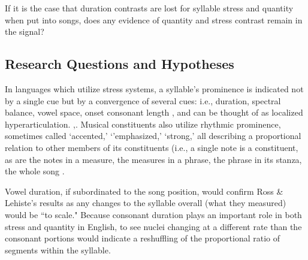 \documentclass[12pt]{article}
\begin{document}
If it is the case that duration contrasts are lost for syllable stress and quantity when put into songs, does any evidence of quantity and stress contrast remain in the signal? 
%
%






\subsection*{Research Questions and Hypotheses}

In languages which utilize stress systems, a syllable's prominence is indicated not by a single cue but by a convergence of several cues: i.e.,  duration\cite{dejongStressLexicalFocus2004}, spectral balance\cite{sluijterSpectralBalanceAcoustic1996}, vowel space\cite{dejongSupraglottalArticulationProminence1995}, onset consonant length \cite{gordonPHONETICCORRELATESSTRESS1997}, and can be thought of as localized hyperarticulation. \cite{libermanStressLinguisticRhythm1977},\cite{berinsteinWPPNo471979,}. 
Musical constituents also utilize rhythmic prominence, sometimes called `accented,' `'emphasized,' `strong,' all describing a proportional relation to other members of its constituents (i.e., a single note is a constituent, as are the notes in a measure,  the measures in a phrase, the phrase in its stanza, the whole song . \cite{}

Vowel duration, if subordinated to the song position, would confirm Ross \& Lehiste's results \cite{rossLostProsodicOppositions1994, rossTimingEstonianFolk1998, rossTradeoffQuantityStress1996} as any changes to the syllable overall (what they measured) would be ``to scale." Because consonant duration plays an important role in both stress and quantity in English, to see nuclei changing at a different rate than the consonant portions would indicate a reshuffling of the proportional ratio of segments within the syllable. 
\end{document}
